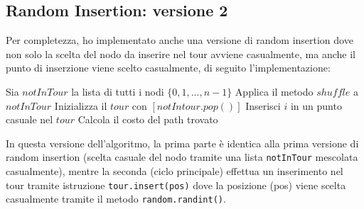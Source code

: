 \documentclass[a4paper,12pt]{report}
\begin{document}
\subsection{Random Insertion: versione 2}
Per completezza, ho implementato anche una versione di random insertion dove non solo la scelta del nodo da inserire nel tour avviene casualmente, ma anche il punto di inserzione viene scelto casualmente, di seguito l'implementazione:
\begin{tcolorbox}[colframe=black, colback=white, boxrule=0.5pt, title=Random Insertion Versione 2, coltitle=black, fonttitle=\bfseries, colbacktitle=white, breakable]
  \begin{algorithmic}[1]
    \State Sia $notInTour$ la lista di tutti i nodi $\{0, 1, ..., n - 1\}$
    \State Applica il metodo $shuffle$ a $notInTour$
    \State Inizializza il $tour$ con $[notIntour.pop()]$
      \State Inserisci $i$ in un punto casuale nel $tour$
    \EndFor
    \State Calcola il costo del path trovato
  \end{algorithmic}
  \end{tcolorbox}
In questa versione dell'algoritmo, la prima parte è identica alla prima versione di random insertion (scelta casuale del nodo tramite una lista \lstinline!notInTour! mescolata casualmente), mentre la seconda (ciclo principale) effettua un inserimento nel tour tramite istruzione \lstinline|tour.insert(pos)| dove la posizione (pos) viene scelta casualmente tramite il metodo \lstinline|random.randint()|.
\end{document}
